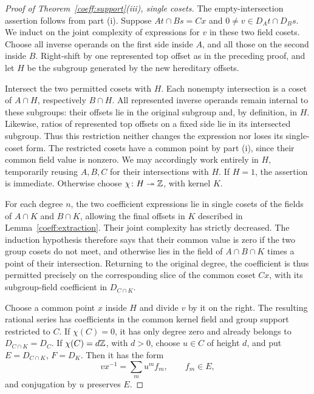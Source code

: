 \begin{proof}[Proof of Theorem~\ref{coeff:support}(iii), single cosets]
The empty-intersection assertion follows from part (i). Suppose
\(At\cap Bs=Cx\) and \(0\ne v\in D_At\cap D_Bs\). We induct on the
joint complexity of expressions for \(v\) in these two field cosets.
Choose all inverse operands on the first side inside \(A\), and all
those on the second inside \(B\). Right-shift by one represented top
offset as in the preceding proof, and let \(H\) be the subgroup
generated by the new hereditary offsets.

Intersect the two permitted cosets with \(H\). Each nonempty
intersection is a coset of \(A\cap H\), respectively \(B\cap H\).
All represented inverse operands remain internal to these subgroups:
their offsets lie in the original subgroup and, by definition, in
\(H\). Likewise, ratios of represented top offsets on a fixed side
lie in its intersected subgroup. Thus this restriction neither changes
the expression nor loses its single-coset form. The restricted cosets
have a common point by part (i), since their common field value is
nonzero. We may accordingly work entirely in \(H\), temporarily
reusing \(A,B,C\) for their intersections with \(H\).
If \(H=1\), the assertion is immediate.
Otherwise choose \(\chi\colon H\twoheadrightarrow\mathbb Z\), with kernel
\(K\).

For each degree \(n\), the two coefficient expressions lie in single
cosets of the fields of \(A\cap K\) and \(B\cap K\), allowing the
final offsets in \(K\) described in
Lemma~\ref{coeff:extraction}. Their joint complexity has strictly
decreased. The induction hypothesis therefore says that their common
value is zero if the two group cosets do not meet, and otherwise lies
in the field of \(A\cap B\cap K\) times a point of their
intersection. Returning to the original degree, the coefficient is
thus permitted precisely on the corresponding slice of the common
coset \(Cx\), with its subgroup-field coefficient in
\(D_{C\cap K}\).

Choose a common point \(x\) inside \(H\) and divide \(v\) by it on
the right. The resulting rational series has coefficients in the common
kernel field and group support restricted to \(C\). If
\(\chi(C)=0\), it has only degree zero and already belongs to
\(D_{C\cap K}=D_C\). If \(\chi(C)=d\mathbb Z\), with \(d>0\), choose
\(u\in C\) of height \(d\), and put
\(E=D_{C\cap K}\), \(F=D_K\). Then it has the form
\begin{equation}\label{coeff:common-series}
 vx^{-1}=\sum_m u^m f_m,\qquad f_m\in E,
\end{equation}
and conjugation by \(u\) preserves \(E\).


\end{proof}
